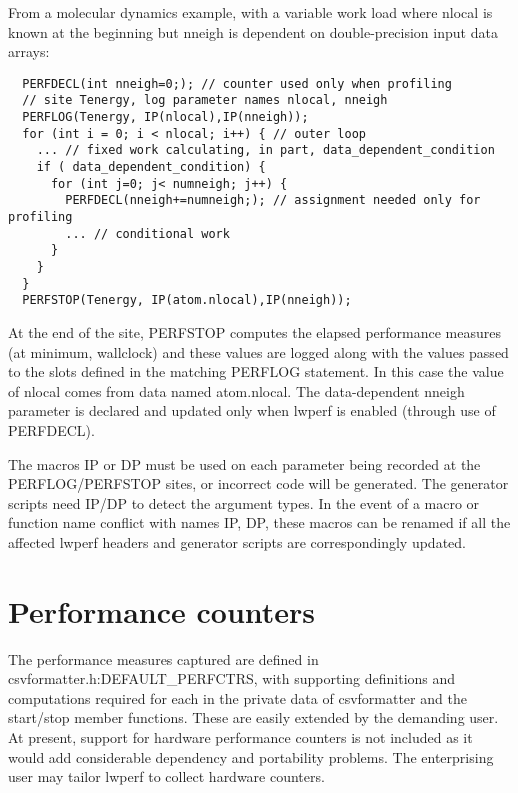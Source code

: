 From a molecular dynamics example, with a variable work load where nlocal is known at the beginning but nneigh is dependent on double-precision input data arrays:
\begin{verbatim}
  PERFDECL(int nneigh=0;); // counter used only when profiling
  // site Tenergy, log parameter names nlocal, nneigh
  PERFLOG(Tenergy, IP(nlocal),IP(nneigh)); 
  for (int i = 0; i < nlocal; i++) { // outer loop
    ... // fixed work calculating, in part, data_dependent_condition
    if ( data_dependent_condition) {
      for (int j=0; j< numneigh; j++) {
        PERFDECL(nneigh+=numneigh;); // assignment needed only for profiling
        ... // conditional work
      }
    }
  }
  PERFSTOP(Tenergy, IP(atom.nlocal),IP(nneigh));
\end{verbatim}

At the end of the site, PERFSTOP computes the elapsed performance measures (at minimum, wallclock) and these values are logged along with the values passed to the slots defined in the matching PERFLOG statement. In this case the value of nlocal comes from data named atom.nlocal. The data-dependent nneigh parameter is declared and updated only when lwperf is enabled (through use of PERFDECL).

The macros IP or DP must be used on each parameter being recorded at the PERFLOG/PERFSTOP sites, or incorrect code will be generated. The generator scripts need IP/DP to detect the argument types. In the event of a macro or function name conflict with names IP, DP, these macros can be renamed if all the affected lwperf headers and generator scripts are correspondingly updated.

\section{Performance counters}
The performance measures captured are defined in csvformatter.h:DEFAULT\_PERFCTRS, with supporting definitions and computations required for each in the private data of csvformatter and the start/stop member functions. These are easily extended by the demanding user. At present, support for hardware performance counters is not included as it would add considerable dependency and portability problems. The enterprising user may tailor lwperf to collect hardware counters.



